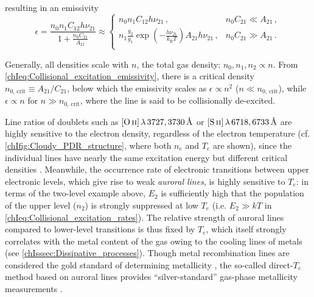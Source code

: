 \noindent resulting in an emissivity
\begin{equation}
    \label{chIeq:Collisional_excitation_emissivity}
    \epsilon = \frac{n_0 n_1 C_{12} h \nu_{21}}{1 + \frac{n_0 C_{21}}{A_{21}}} \approx \left\{
    \begin{array}{ll}
         n_0 n_1 C_{12} h \nu_{21} \, , & n_0 C_{21} \ll A_{21} \, , \\
        
         n_1 \frac{g_2}{g_1} \exp \left( - \frac{h \nu_{21}}{k_\text{B} T} \right) A_{21} h \nu_{21} \, , & n_0 C_{21} \gg A_{21} \, . \\
    \end{array}
    \right.
\end{equation}

Generally, all densities scale with $n$, the total gas density: $n_0, n_1, n_2 \propto n$. From \cref{chIeq:Collisional_excitation_emissivity}, there is a critical density $n_{0, \, \text{crit}} \equiv A_{21}/C_{21}$, below which the emissivity scales as $\epsilon \propto n^2$ ($n \ll n_{0, \, \text{crit}}$), while $\epsilon \propto n$ for $n \gg n_{0, \, \text{crit}}$, where the line is said to be collisionally de-excited.

Line ratios of doublets such as $\OII \, \lambda \, 3727, 3730 \, \Angstrom$ or $\SII \, \lambda \, 6718, 6733 \, \Angstrom$ are highly sensitive to the electron density, regardless of the electron temperature (cf. \cref{chIfig:Cloudy_PDR_structure}, where both $n_e$ and $T_e$ are shown), since the individual lines have nearly the same excitation energy but different critical densities . Meanwhile, the occurrence rate of electronic transitions between upper electronic levels, which give rise to weak \textit{auroral lines}, is highly sensitive to $T_e$: in terms of the two-level example above, $E_2$ is sufficiently high that the population of the upper level ($n_2$) is strongly suppressed at low $T_e$ (i.e. $E_2 \gg kT$ in \cref{chIeq:Collisional_excitation_rates}). The relative strength of auroral lines compared to lower-level transitions is thus fixed by $T_e$, which itself strongly correlates with the metal content of the gas owing to the cooling lines of metals (see \cref{chIsssec:Dissipative_processes}). Though metal recombination lines are considered the gold standard of determining metallicity \citep[yet are practically unviable for distant galaxies;][]{2019ARA&A..57..511K}, the so-called direct-$T_e$ method based on auroral lines provides ``silver-standard'' gas-phase metallicity measurements \citep[e.g.][]{2016ApJ...825L..23S, 2021ApJ...914...19S, 2017MNRAS.465.1384C, 2022arXiv220712375C}.


